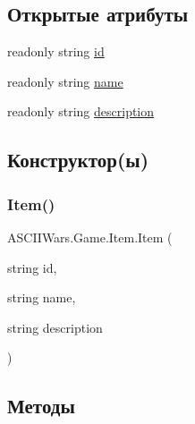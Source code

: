 \subsection*{Открытые атрибуты}
\begin{DoxyCompactItemize}
\item 
readonly string \hyperlink{class_a_s_c_i_i_wars_1_1_game_1_1_item_a744d51f7684a4e46a1f834f8666db58e}{id}
\item 
readonly string \hyperlink{class_a_s_c_i_i_wars_1_1_game_1_1_item_a994b9ec5f10c123e4345da159c090091}{name}
\item 
readonly string \hyperlink{class_a_s_c_i_i_wars_1_1_game_1_1_item_a6ff41e953ccebc64a8df8f8c434535a0}{description}
\end{DoxyCompactItemize}


\subsection{Конструктор(ы)}
\hypertarget{class_a_s_c_i_i_wars_1_1_game_1_1_item_ae9b7ebce1c577c6d4e142f7d8f736ec5}{}\label{class_a_s_c_i_i_wars_1_1_game_1_1_item_ae9b7ebce1c577c6d4e142f7d8f736ec5} 
\subsubsection{\texorpdfstring{Item()}{Item()}}
{\footnotesize\ttfamily A\+S\+C\+I\+I\+Wars.\+Game.\+Item.\+Item (\begin{DoxyParamCaption}\item[{string}]{id,  }\item[{string}]{name,  }\item[{string}]{description }\end{DoxyParamCaption})\hspace{0.3cm}{\ttfamily [inline]}}



\subsection{Методы}
\hypertarget{class_a_s_c_i_i_wars_1_1_game_1_1_item_a8a91f74db078fbb15657f28ef92155f8}{}\label{class_a_s_c_i_i_wars_1_1_game_1_1_item_a8a91f74db078fbb15657f28ef92155f8} 
